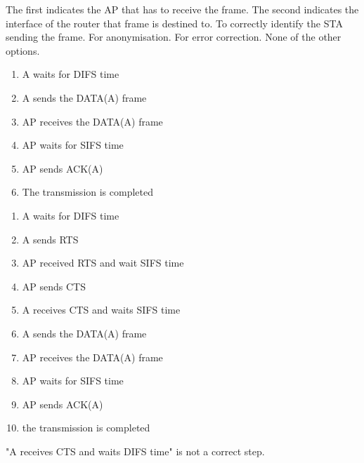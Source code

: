 \begin{checkboxes}
    \CorrectChoice The first indicates the AP that has to receive the frame. The second indicates the interface of the router that frame is destined to.
    \choice To correctly identify the STA sending the frame.
    \choice For anonymisation.
    \choice For error correction.
    \choice None of the other options.
\end{checkboxes}

\begin{solution}
    \begin{enumerate}
        \item A waits for DIFS time
        \item A sends the DATA(A) frame
        \item AP receives the DATA(A) frame
        \item AP waits for SIFS time
        \item AP sends ACK(A)
        \item The transmission is completed
    \end{enumerate}
\end{solution}

\begin{solution}
    \begin{enumerate}
        \item A waits for DIFS time
        \item A sends RTS
        \item AP received RTS and wait SIFS time
        \item AP sends CTS
        \item A receives CTS and waits SIFS time
        \item A sends the DATA(A) frame
        \item AP receives the DATA(A) frame
        \item AP waits for SIFS time
        \item AP sends ACK(A)
        \item the transmission is completed
    \end{enumerate}
    "A receives CTS and waits DIFS time" is not a correct step.
\end{solution}

